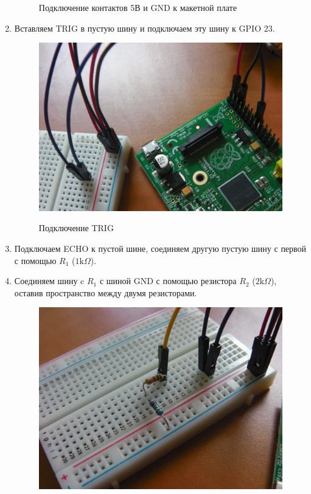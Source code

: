 \documentclass[a4paper, 14pt]{article}
\begin{document}
\begin{enumerate}
\begin{figure}[H]
		      \caption{Подключение контактов 5В и GND к макетной плате}
	      \end{figure}
	\item Вставляем TRIG в пустую шину и подключаем эту шину к GPIO 23.
	      \begin{figure}[H]
		      \centering
		      \includegraphics[width=14cm]{screenshots/8.png}\\
		      \caption{Подключение TRIG}
	      \end{figure}
	\item Подключаем ECHO к пустой шине, соединяем другую пустую шину с первой с помощью $R_1$ ($1 \text{k}\Omega$).
	\item Соединяем шину c $R_1$ с шиной GND с помощью резистора $R_2$ ($2 \text{k}\Omega$), оставив пространство между двумя резисторами.
	      \begin{figure}[H]
		      \centering
		      \includegraphics[width=14cm]{screenshots/9.png}\\

\end{figure}
\end{enumerate}
\end{document}
